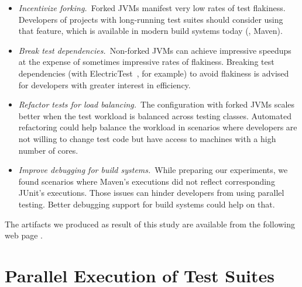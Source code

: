 \documentclass[10pt,journal,compsoc]{IEEEtran}
\begin{document}
\begin{itemize}
\item \emph{Incentivize forking.}~Forked JVMs manifest very low rates
  of test flakiness.  Developers of projects with long-running test
  suites should consider using that feature, which is available in
  modern build systems today (\eg{}, Maven).
\item \emph{Break test dependencies.}~Non-forked JVMs can achieve
  impressive speedups at the expense of sometimes impressive rates of
  flakiness.  Breaking test dependencies (with
  ElectricTest~\cite{bell-etal-esecfse2015}, for example) to avoid flakiness is advised for developers with
  greater interest in efficiency.
\item \emph{Refactor tests for load balancing.}~The configuration with
  forked JVMs scales
  better when the test workload is balanced
  across testing classes.  Automated refactoring could help balance
  the workload in scenarios where developers are not willing to change
  test code but have access to machines with a high number of cores.
\item \emph{Improve debugging for build systems.}~While preparing our
  experiments, we found scenarios where Maven's executions did not reflect
  corresponding JUnit's executions. Those issues can hinder developers from using parallel
  testing. Better debugging support for build systems could help
  on that. 
\end{itemize}

The artifacts we produced as result of this study are available from
the following web page \webpage{}.



\section{\label{sec:background}Parallel Execution of Test Suites}
\end{document}
